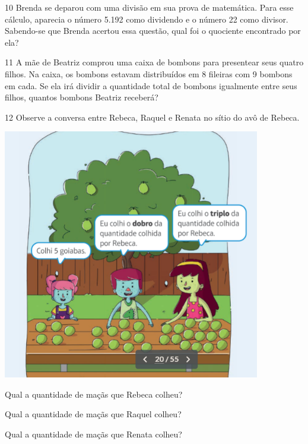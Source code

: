 \num{10} Brenda se deparou com uma divisão em sua prova de matemática. Para esse
cálculo, aparecia o número 5.192 como dividendo e o número 22 como divisor. Sabendo-se que
Brenda acertou essa questão, qual foi o quociente encontrado por ela?



\num{11} A mãe de Beatriz comprou uma caixa de bombons para presentear seus
quatro filhos. Na caixa, os bombons estavam distribuídos em 8 fileiras
com 9 bombons em cada. Se ela irá dividir a quantidade total de bombons
igualmente entre seus filhos, quantos bombons Beatriz receberá?


\num{12} Observe a conversa entre Rebeca, Raquel e Renata no sítio do avô de Rebeca.

\includegraphics[width=4.42538in,height=4.30871in]{./media/image24.png}


\begin{escolha}
\item Qual a quantidade de maçãs que Rebeca colheu?
\reduline{5\hfill}

\item Qual a quantidade de maçãs que Raquel colheu?

\item Qual a quantidade de maçãs que Renata colheu?
\end{escolha}

